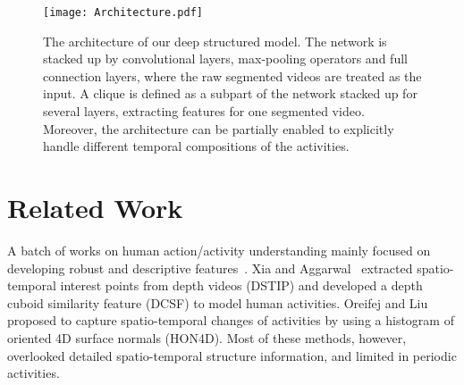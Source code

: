 \documentclass{sig-alternate}
\begin{document}

\begin{figure*}[!ht]
\centering
\texttt{[image: Architecture.pdf]}
\caption{ The architecture of our deep structured model.  The network is stacked up by convolutional layers, max-pooling operators and full connection layers, where the raw segmented videos are treated as the input. A clique is defined as a subpart of the network stacked up for several layers, extracting features for one segmented video. Moreover, the architecture can be partially enabled to explicitly handle different temporal compositions of the activities. }\label{fig:Architecture}
\end{figure*}

\section{Related Work}


A batch of works on human action/activity understanding mainly focused on developing robust and descriptive features~\cite{DSTIP,diMM13,HON4D,FG2013,BagSIFT,DMMM12, 3dsiftMM07}. Xia and Aggarwal~\cite{DSTIP} extracted spatio-temporal interest points from depth videos (DSTIP) and developed a depth cuboid similarity feature (DCSF) to model human activities. Oreifej and Liu~\cite{HON4D} proposed to capture spatio-temporal changes of activities by using a histogram of oriented 4D surface normals (HON4D). Most of these methods, however, overlooked detailed spatio-temporal structure information, and limited in periodic activities.
\end{document}
